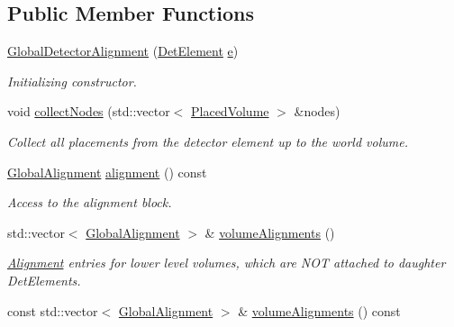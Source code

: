\subsection*{Public Member Functions}
\begin{DoxyCompactItemize}
\item 
\hyperlink{class_d_d4hep_1_1_alignments_1_1_global_detector_alignment_a82f59bb92f37d35c0d9dbe2b342a25ca}{Global\+Detector\+Alignment} (\hyperlink{class_d_d4hep_1_1_geometry_1_1_det_element}{Det\+Element} \hyperlink{_volumes_8cpp_a8a9a1f93e9b09afccaec215310e64142}{e})
\begin{DoxyCompactList}\small\item\em Initializing constructor. \end{DoxyCompactList}\item 
void \hyperlink{class_d_d4hep_1_1_alignments_1_1_global_detector_alignment_ac3bae1db0cf6bd1d5df4514d343cb352}{collect\+Nodes} (std\+::vector$<$ \hyperlink{class_d_d4hep_1_1_geometry_1_1_placed_volume}{Placed\+Volume} $>$ \&nodes)
\begin{DoxyCompactList}\small\item\em Collect all placements from the detector element up to the world volume. \end{DoxyCompactList}\item 
\hyperlink{class_d_d4hep_1_1_alignments_1_1_global_alignment}{Global\+Alignment} \hyperlink{class_d_d4hep_1_1_alignments_1_1_global_detector_alignment_a3a5011151fd6fe30463d7ad7fdbcf9b1}{alignment} () const
\begin{DoxyCompactList}\small\item\em Access to the alignment block. \end{DoxyCompactList}\item 
std\+::vector$<$ \hyperlink{class_d_d4hep_1_1_alignments_1_1_global_alignment}{Global\+Alignment} $>$ \& \hyperlink{class_d_d4hep_1_1_alignments_1_1_global_detector_alignment_aac0cf5fe586639599e736913cadf00c2}{volume\+Alignments} ()
\begin{DoxyCompactList}\small\item\em \hyperlink{class_d_d4hep_1_1_alignments_1_1_alignment}{Alignment} entries for lower level volumes, which are N\+OT attached to daughter Det\+Elements. \end{DoxyCompactList}\item 
const std\+::vector$<$ \hyperlink{class_d_d4hep_1_1_alignments_1_1_global_alignment}{Global\+Alignment} $>$ \& \hyperlink{class_d_d4hep_1_1_alignments_1_1_global_detector_alignment_a5b1f3416dd0ba2b7e75973c2efdd1e67}{volume\+Alignments} () const

\end{DoxyCompactItemize}
